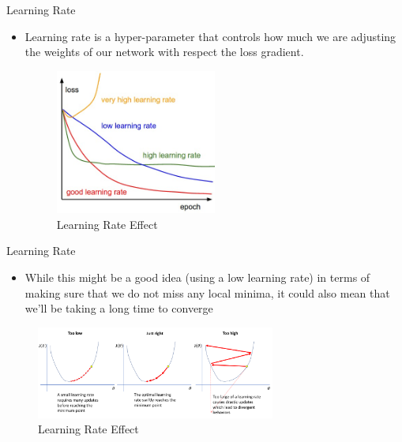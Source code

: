 \begin{frame}{Learning Rate}
    \begin{itemize}
        \item Learning rate is a hyper-parameter that controls how much we are adjusting the weights of our network with respect the loss gradient. 
        \begin{figure}[H]
    		\centering
    		\includegraphics[width=0.5\textwidth]{Figs/lr.png}
    		\caption{Learning Rate Effect}
	    \end{figure}
    \end{itemize}        
\end{frame}

\begin{frame}{Learning Rate}
    \begin{itemize}
	    \item While this might be a good idea (using a low learning rate) in terms of making sure that we do not miss any local minima, it could also mean that we’ll be taking a long time to converge
    \end{itemize}  
    \begin{figure}[H]
    		\centering
    		\includegraphics[width=0.7\textwidth]{Figs/lr_2.png}
    		\caption{Learning Rate Effect}
    \end{figure}
\end{frame}


